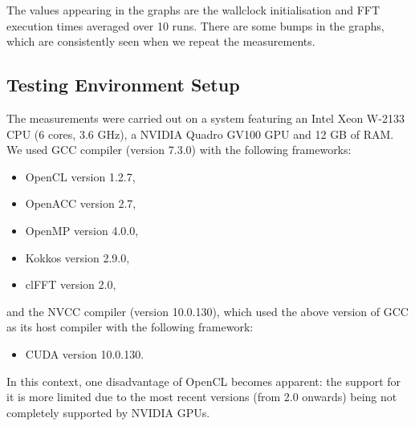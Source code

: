\documentclass[12pt, a4paper]{article}
\begin{document}
The
values appearing in the graphs are the wallclock initialisation and FFT execution
times averaged over 10 runs. There are some bumps in the graphs, which
are consistently seen when we repeat the measurements.

\subsection{Testing Environment Setup}

The measurements were carried out on a system featuring an Intel Xeon
W-2133 CPU (6 cores, 3.6 GHz), a NVIDIA Quadro GV100 GPU and 12 GB of
RAM. We used GCC compiler (version 7.3.0) with the following frameworks:
\begin{itemize}
 \item OpenCL version 1.2.7,
 \item OpenACC version 2.7,
 \item OpenMP version 4.0.0,
 \item Kokkos version 2.9.0,
 \item clFFT version 2.0,
\end{itemize}
and the NVCC compiler (version 10.0.130), which used the above version
of GCC as its host compiler with the following framework:
\begin{itemize}
\item CUDA version 10.0.130.
\end{itemize}


In this context, one disadvantage of OpenCL becomes
apparent: the support for it is more limited due to the most recent versions
(from 2.0 onwards) being not completely supported by NVIDIA GPUs.
\end{document}
